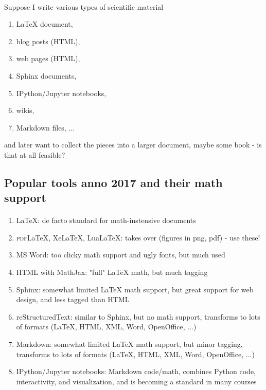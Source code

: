 \documentclass[%
oneside,                 %
final,                   %
10pt]{article}
\begin{document}
\paragraph{}
Suppose I write various types of scientific material
\begin{enumerate}
\item {\LaTeX} document,

\item blog posts (HTML),

\item web pages (HTML),

\item Sphinx documents,

\item IPython/Jupyter notebooks,

\item wikis,

\item Markdown files, ...
\end{enumerate}

\noindent
and later want to collect the pieces into a larger document, maybe some book - is that at all feasible?




\subsection*{Popular tools anno 2017 and their math support}

\paragraph{}
\begin{enumerate}
\item {\LaTeX}: de facto standard for math-instensive documents

\item \textsc{pdf}{\LaTeX}, XeLaTeX, LuaLaTeX: takes over (figures in png, pdf) - use these!

\item MS Word: too clicky math support and ugly fonts, but much used

\item HTML with MathJax: "full" {\LaTeX} math, but much tagging

\item Sphinx: somewhat limited {\LaTeX} math support, but great support for web design, and less tagged than HTML

\item reStructuredText: similar to Sphinx, but no math support, transforms to lots of formats ({\LaTeX}, HTML, XML, Word, OpenOffice, ...)

\item Markdown: somewhat limited {\LaTeX} math support, but minor tagging, transforms to lots of formats ({\LaTeX}, HTML, XML, Word, OpenOffice, ...)

\item IPython/Jupyter notebooks: Markdown code/math, combines Python code, interactivity, and visualization, and is becoming a standard in many courses
\end{enumerate}
\end{document}
